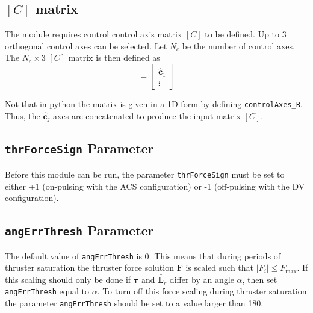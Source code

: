 \subsection{$[C]$ matrix}
The module requires control control axis matrix $[C]$ to be defined.  Up to 3 orthogonal control axes can be selected.  Let $N_{c}$ be the number of control axes.  The $N_{c}\times 3$ $[C]$ matrix is then defined as
\begin{equation}
	[C] = \begin{bmatrix}
		\hat{\bm c}_{1}
		\\
		\vdots
	\end{bmatrix}
\end{equation}

Not that in python the matrix is given in a 1D form by defining {\tt controlAxes\_B}.  Thus, the $\hat{\bm c}_{j}$ axes are concatenated to produce the input matrix $[C]$. 

\subsection{{\tt thrForceSign} Parameter}
Before this module can be run, the parameter {\tt thrForceSign} must be set to either +1 (on-pulsing with the ACS configuration) or -1 (off-pulsing with the DV configuration).

\subsection{{\tt angErrThresh} Parameter}
The default value of {\tt angErrThresh} is 0\dg.  This means that during periods of thruster saturation the thruster force solution $\bm F$ is scaled such that $|F_{i}| \le F_{\text{max}}$.  If this scaling should only be done if $\bm\tau$ and $\bar{\bm L}_{r}$ differ by an angle $\alpha$, then set {\tt angErrThresh} equal to $\alpha$.  To turn off this force scaling during thruster saturation the parameter   {\tt angErrThresh} should be set to a value larger than 180\dg.  

